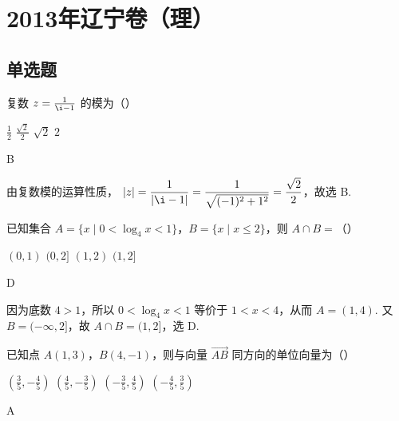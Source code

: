 \chapter{2013年辽宁卷（理）}

\section{单选题}

\begin{problem}
复数 \(z = \frac{1}{\i - 1}\) 的模为（\quad）

\choices
    {\(\frac{1}{2}\)}
    {\(\frac{\sqrt{2}}{2}\)}
    {\(\sqrt{2}\)}
    {\(2\)}
\end{problem}

\begin{answer}
B
\end{answer}

\begin{solution}
由复数模的运算性质，
\(\lvert z\rvert=\dfrac{1}{\lvert\i-1\rvert}=\dfrac{1}{\sqrt{(-1)^2+1^2}}=\dfrac{\sqrt{2}}{2}\)，故选 B.
\end{solution}

\begin{problem}
已知集合 \(A = \{x \mid 0 < \log_4 x < 1\}\)，\(B = \{x \mid x \leqslant 2\}\)，则 \(A \cap B =\)（\quad）

\choices
    {\((0,1)\)}
    {\((0,2]\)}
    {\((1,2)\)}
    {\((1,2]\)}
\end{problem}

\begin{answer}
D
\end{answer}

\begin{solution}
因为底数 \(4>1\)，所以 \(0<\log_4x<1\) 等价于 \(1<x<4\)，从而 \(A=(1,4)\). 又 \(B=(-\infty,2]\)，故 \(A\cap B=(1,2]\)，选 D.
\end{solution}

\begin{problem}
已知点 \(A(1,3)\)，\(B(4,-1)\)，则与向量 \(\overrightarrow{AB}\) 同方向的单位向量为（\quad）

\choices
    {\(\left(\frac{3}{5}, -\frac{4}{5}\right)\)}
    {\(\left(\frac{4}{5}, -\frac{3}{5}\right)\)}
    {\(\left(-\frac{3}{5}, \frac{4}{5}\right)\)}
    {\(\left(-\frac{4}{5}, \frac{3}{5}\right)\)}
\end{problem}

\begin{answer}
A
\end{answer}

